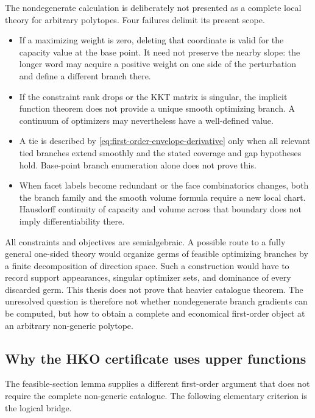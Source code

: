 The nondegenerate calculation is deliberately not presented as a complete local
theory for arbitrary polytopes.  Four failures delimit its present scope.

\begin{itemize}
\item If a maximizing weight is zero, deleting that coordinate is valid for
  the capacity value at the base point.  It need not preserve the nearby
  slope: the longer word may acquire a positive weight on one side of the
  perturbation and define a different branch there.
\item If the constraint rank drops or the KKT matrix is singular, the implicit
  function theorem does not provide a unique smooth optimizing branch.  A
  continuum of optimizers may nevertheless have a well-defined value.
\item A tie is described by \eqref{eq:first-order-envelope-derivative} only
  when all relevant tied branches extend smoothly and the stated coverage
  and gap hypotheses hold.  Base-point branch enumeration alone does not prove
  this.
\item When facet labels become redundant or the face combinatorics changes,
  both the branch family and the smooth volume formula require a new local
  chart.  Hausdorff continuity of capacity and volume across that boundary
  does not imply differentiability there.
\end{itemize}

All constraints and objectives are semialgebraic.  A possible route to a fully
general one-sided theory would organize germs of feasible optimizing branches
by a finite decomposition of direction space.  Such a construction
would have to record support appearances, singular optimizer sets, and
dominance of every discarded germ.  This thesis does not prove that heavier
catalogue theorem.  The unresolved question is therefore not whether nondegenerate
branch gradients can be computed, but how to obtain a complete and economical
first-order object at an arbitrary non-generic polytope.

\subsection{Why the HKO certificate uses upper functions}
\label{subsec:first-order-hko-upper-functions}

The feasible-section lemma supplies a different first-order argument that does
not require the complete non-generic catalogue.  The following elementary
criterion is the logical bridge.

